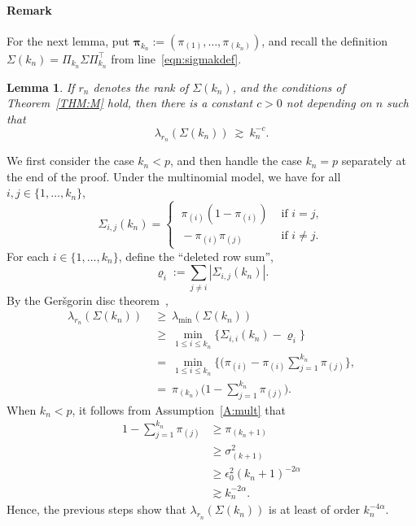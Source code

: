 \documentclass[aos,preprint]{imsart}
\numberwithin{equation}{section}
\theoremstyle{plain}
\newtheorem{lemma}{Lemma}[section]
\newcommand{\e}{\epsilon}
\newcommand{\ttop}{^{\top}}
\newcommand{\tsum}{\textstyle\sum}
\newcommand{\1}{{\bf{1}}}
\newcommand{\0}{\mathbf{0}}
\begin{document}
\paragraph{Remark} For the next lemma, put $\boldsymbol \pi_{k_n}:=(\pi_{(1)},\dots,\pi_{(k_n)})$, and recall the definition $\Sigma(k_n)=\Pi_{k_n}\Sigma\Pi_{k_n}\ttop$ from line~\eqref{eqn:sigmakdef}.


\begin{lemma}\label{lem:lambdamin}
%
If $r_n$ denotes the rank of $\Sigma(k_n)$, and the conditions of Theorem~\ref{THM:M} hold, then there is a constant $c>0$ not depending on $n$ such that
\begin{equation}
\lambda_{r_n}(\Sigma(k_n)) \ \gtrsim \ k_n^{-c}.
\end{equation}
%
\end{lemma}
\proof  We first consider the case $k_n<p$, and then handle the case $k_n=p$ separately at the end of the proof. 
 Under the multinomial model, we have for all $i,j\in\{1,\dots,k_n\}$,
$$\Sigma_{i,j}(k_n) = \begin{cases} \  \pi_{(i)}(1-\pi_{(i)}) & \text{ if } i=j, \\ \ -\pi_{(i)}\pi_{(j)} & \text{ if } i\neq j. \end{cases}$$
For each $i\in\{1,\dots,k_n\}$, define the ``deleted row sum'', 
$$\varrho_i:=\sum_{j\neq i}|\Sigma_{i,j}(k_n)|.$$
By the Ger\v{s}gorin disc theorem~\citep[Sec. 6.1]{Horn:Johnson:1990}, 
%
\begin{equation}
\begin{split}
\lambda_{r_n}(\Sigma(k_n)) & \ \geq \ \lambda_{\min}(\Sigma(k_n))\\[0.2cm]
 & \ \geq \  \min_{1\leq i\leq k_n}\Big\{\Sigma_{i,i}(k_n)  - \varrho_i\Big\}\\[0.2cm]
%
& \ = \ \min_{1\leq i\leq k_n} \Big\{(\pi_{(i)} -\pi_{(i)}\tsum_{j=1}^{k_n}\pi_{(j)}\Big\},\\[0.2cm]
%
& \ = \ \pi_{(k_n)}\Big(1-\tsum_{j=1}^{k_n} \pi_{(j)}\Big).
\end{split}
\end{equation}
When $k_n<p$, it follows from Assumption~\ref{A:mult} that
\begin{equation}
\begin{split}
1-\tsum_{j=1}^{k_n}\pi_{(j)}&\geq \pi_{(k_n+1)}\\[0.2cm]
%
&\geq \sigma_{(k+1)}^2\\[0.2cm]
%
&\geq \e_0^2 (k_n+1)^{-2\alpha}\\[0.2cm]
%
&\gtrsim k_n^{-2\alpha}.
\end{split}
\end{equation}
Hence, the previous steps show that $\lambda_{r_n}(\Sigma(k_n))$ is at least of order $k_n^{-4\alpha}$.
\end{document}

